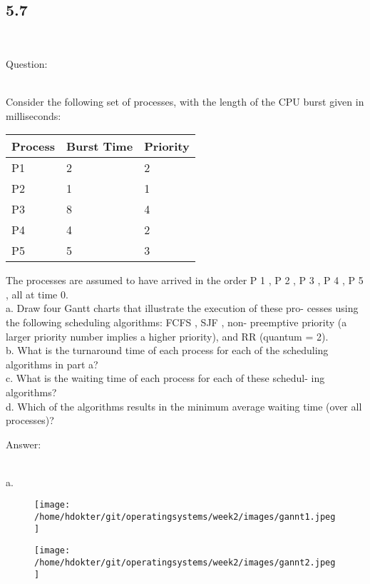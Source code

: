 \documentclass[]{article}
\begin{document}
\subsection*{5.7}\
\begin{bfseries} Question: \end{bfseries}\\
Consider the following set of processes, with the length of the CPU burst
given in milliseconds:\\
\begin{tabular}{|l|l|l|}
Process & Burst Time & Priority\\
\hline
P1 & 2 & 2 \\
\hline
P2 & 1 & 1 \\
\hline
P3 & 8 & 4 \\
\hline
P4 & 4 & 2 \\
\hline
P5 & 5 & 3 \\
\end {tabular}

The processes are assumed to have arrived in the order P 1 , P 2 , P 3 , P 4 , P 5 ,
all at time 0.\\

a. Draw four Gantt charts that illustrate the execution of these pro-
cesses using the following scheduling algorithms: FCFS , SJF , non-
preemptive priority (a larger priority number implies a higher
priority), and RR (quantum = 2).\\
b. What is the turnaround time of each process for each of the
scheduling algorithms in part a?\\
c. What is the waiting time of each process for each of these schedul-
ing algorithms?\\
d. Which of the algorithms results in the minimum average waiting
time (over all processes)?\\

\begin{bfseries} Answer: \end{bfseries}\\
a.\\

\begin{figure}[H]
  \texttt{[image: /home/hdokter/git/operatingsystems/week2/images/gannt1.jpeg]}
\end{figure}

\begin{figure}[H]
  \texttt{[image: /home/hdokter/git/operatingsystems/week2/images/gannt2.jpeg]}
\end{figure}
 
\end{document}
